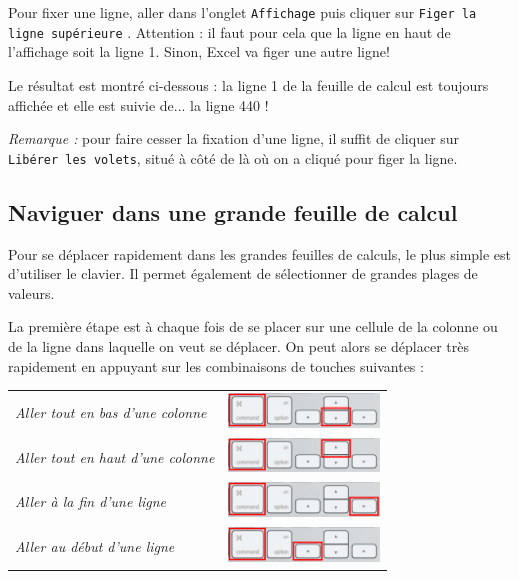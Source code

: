 
Pour fixer une ligne, aller dans l'onglet \texttt{Affichage}  puis cliquer sur \texttt{Figer la ligne supérieure} . Attention : il faut pour cela que la ligne en haut de l'affichage soit la ligne 1. Sinon, Excel va figer une autre ligne!


Le résultat est montré ci-dessous : la ligne 1 de la feuille de calcul est toujours affichée et elle est suivie de... la ligne 440 !



\emph{Remarque :} pour faire cesser la fixation d'une ligne, il suffit de cliquer sur \texttt{Libérer les volets}, situé à côté de là où on a cliqué pour figer la ligne.


\subsection{Naviguer dans une grande feuille de calcul}\label{Calc3navigue} 
Pour se déplacer rapidement dans les grandes feuilles de calculs, le plus simple est d'utiliser le clavier. Il permet également de sélectionner de grandes plages de valeurs.

La première étape est à chaque fois de se placer sur une cellule de la colonne ou de la ligne dans laquelle on veut se déplacer. On peut alors se déplacer très rapidement en appuyant sur les combinaisons de touches suivantes :

\begin{center}
	\begin{tabular}{ll}
		\textsl{Aller tout en bas d'une colonne} & \includegraphics[width=4cm]{./images/tableur03/clavierCmDdown} \\     
		\textsl{Aller tout en haut d'une colonne} & \includegraphics[width=4cm]{./images/tableur03/clavierCmDup} \\  
		\textsl{Aller à la fin d'une ligne} & \includegraphics[width=4cm]{./images/tableur03/clavierCmDright} \\  
		\textsl{Aller au début d'une ligne} & \includegraphics[width=4cm]{./images/tableur03/clavierCmDleft} \\  
	\end{tabular}
\end{center}

